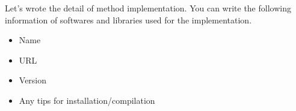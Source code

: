 ﻿Let's wrote the detail of method implementation.
You can write the following information of softwares and libraries used for the implementation.
\begin{itemize}
	\item Name
	\item URL
	\item Version
	\item Any tips for installation/compilation
\end{itemize}
